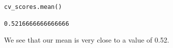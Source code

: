 \documentclass[11pt]{article}
\begin{document}
\begin{verbatim}
cv_scores.mean()
\end{verbatim}

\begin{verbatim}
0.5216666666666666
\end{verbatim}

We see that our mean is very close to a value of 0.52. 
\end{document}
